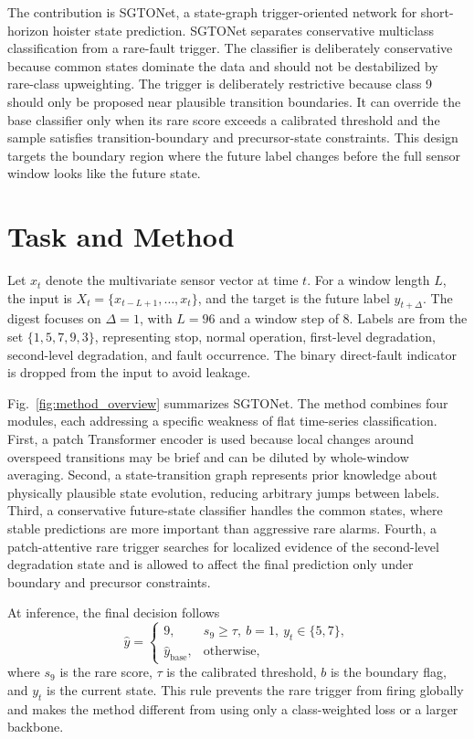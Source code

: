 \documentclass[12pt,letterpaper]{article}
\begin{document}
The contribution is SGTONet, a state-graph trigger-oriented network for short-horizon hoister state prediction. SGTONet separates conservative multiclass classification from a rare-fault trigger. The classifier is deliberately conservative because common states dominate the data and should not be destabilized by rare-class upweighting. The trigger is deliberately restrictive because class 9 should only be proposed near plausible transition boundaries. It can override the base classifier only when its rare score exceeds a calibrated threshold and the sample satisfies transition-boundary and precursor-state constraints. This design targets the boundary region where the future label changes before the full sensor window looks like the future state.

\section{Task and Method}

Let $x_t$ denote the multivariate sensor vector at time $t$. For a window length $L$, the input is $X_t=\{x_{t-L+1},\ldots,x_t\}$, and the target is the future label $y_{t+\Delta}$. The digest focuses on $\Delta=1$, with $L=96$ and a window step of 8. Labels are from the set $\{1,5,7,9,3\}$, representing stop, normal operation, first-level degradation, second-level degradation, and fault occurrence. The binary direct-fault indicator is dropped from the input to avoid leakage.

Fig.~\ref{fig:method_overview} summarizes SGTONet. The method combines four modules, each addressing a specific weakness of flat time-series classification. First, a patch Transformer encoder is used because local changes around overspeed transitions may be brief and can be diluted by whole-window averaging. Second, a state-transition graph represents prior knowledge about physically plausible state evolution, reducing arbitrary jumps between labels. Third, a conservative future-state classifier handles the common states, where stable predictions are more important than aggressive rare alarms. Fourth, a patch-attentive rare trigger searches for localized evidence of the second-level degradation state and is allowed to affect the final prediction only under boundary and precursor constraints.

At inference, the final decision follows
\[
\hat{y} =
\begin{cases}
9, & s_9 \ge \tau,\ b=1,\ y_t \in \{5,7\},\\
\hat{y}_{\mathrm{base}}, & \text{otherwise},
\end{cases}
\]
where $s_9$ is the rare score, $\tau$ is the calibrated threshold, $b$ is the boundary flag, and $y_t$ is the current state. This rule prevents the rare trigger from firing globally and makes the method different from using only a class-weighted loss or a larger backbone.
\end{document}
